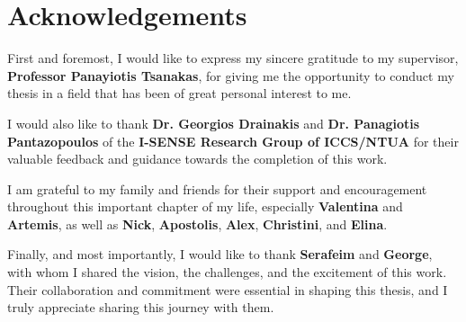 \chapter*{Acknowledgements}

First and foremost, I would like to express my sincere gratitude to my supervisor, \textbf{Professor Panayiotis Tsanakas}, for giving me the opportunity to conduct my thesis in a field that has been of great personal interest to me.

I would also like to thank \textbf{Dr. Georgios Drainakis} and \textbf{Dr. Panagiotis Pantazopoulos} of the \textbf{I-SENSE Research Group of ICCS/NTUA} for their valuable feedback and guidance towards the completion of this work.

I am grateful to my family and friends for their support and encouragement throughout this important chapter of my life, especially \textbf{Valentina} and \textbf{Artemis}, as well as \textbf{Nick}, \textbf{Apostolis}, \textbf{Alex}, \textbf{Christini}, and \textbf{Elina}.

Finally, and most importantly, I would like to thank \textbf{Serafeim} and \textbf{George}, with whom I shared the vision, the challenges, and the excitement of this work. Their collaboration and commitment were essential in shaping this thesis, and I truly appreciate sharing this journey with them.

\cleardoublepage
